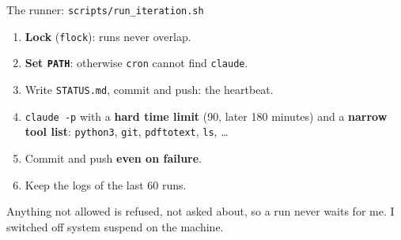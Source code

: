 \documentclass[11pt,aspectratio=169]{beamer}
\newcommand{\datei}[1]{\texttt{#1}}
\begin{document}
\begin{frame}{The runner: \datei{scripts/run\_iteration.sh}}
  \footnotesize
  \hfill
  \begin{minipage}[c]{0.6\textwidth}
    \begin{enumerate}
    \setlength\itemsep{2pt}
    \item \textbf{Lock} (\texttt{flock}): runs never overlap.
    \item \textbf{Set \texttt{PATH}}: otherwise \texttt{cron} cannot find \texttt{claude}.
    \item Write \datei{STATUS.md}, commit and push: the heartbeat.
    \item \texttt{claude -p} with a \textbf{hard time limit} (90, later 180 minutes)
      and a \textbf{narrow tool list}: \texttt{python3}, \texttt{git},
      \texttt{pdftotext}, \texttt{ls}, \dots
    \item Commit and push \textbf{even on failure}.
    \item Keep the logs of the last 60 runs.
    \end{enumerate}
    \medskip
    Anything not allowed is refused, not asked about, so a run never waits for me.
    I switched off system suspend on the machine.
  \end{minipage}
\end{frame}
\end{document}
